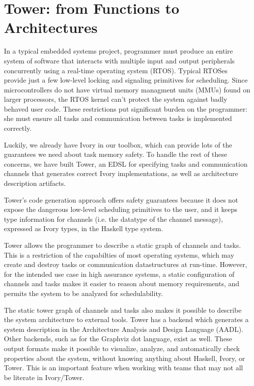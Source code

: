\section{Tower: from Functions to Architectures}
\label{sec:tower}

In a typical embedded systems project, programmer must produce an entire
system of software that interacts with multiple input and output peripherals
concurrently using a real-time operating system (RTOS). Typical RTOSes provide
just a few low-level locking and signaling primitives for scheduling. Since
microcontrollers do not have virtual memory managment units (MMUs) found on
larger processors, the RTOS kernel can't protect the system against badly
behaved user code. These restrictions put significant burden on the programmer:
she must ensure all tasks and communication between tasks is implemented
correctly.

Luckily, we already have Ivory in our toolbox, which can provide lots of the
guarantees we need about task memory safety. To handle the rest of these
concerns, we have built Tower, an EDSL for specifying tasks and communication
channels that generates correct Ivory implementations, as well as architecture
description artifacts.

Tower's code generation approach offers safety guarantees because it does not
expose the dangerous low-level scheduling primitives to the user, and it keeps
type information for channels (i.e. the datatype of the channel message),
expressed as Ivory types, in the Haskell type system.

Tower allows the programmer to describe a static graph of channels and tasks.
This is a restriction of the capabilties of most operating systems, which may
create and destroy tasks or communication datastructures at run-time. However,
for the intended use case in high assurance systems, a static configuration of
channels and tasks makes it easier to reason about memory requirements, and
permits the system to be analyzed for schedulability.

The static tower graph of channels and tasks also makes it possible to
describe the system architecture to external tools. Tower has a backend which
generates a system description in the Architecture Analysis and Design Language
(AADL). Other backends, such as for the Graphviz dot language, exist as well.
These output formats make it possible to visualize, analyze, and automatically
check properties about the system, without knowing anything about Haskell,
Ivory, or Tower. This is an important feature when working with teams that may
not all be literate in Ivory/Tower.

